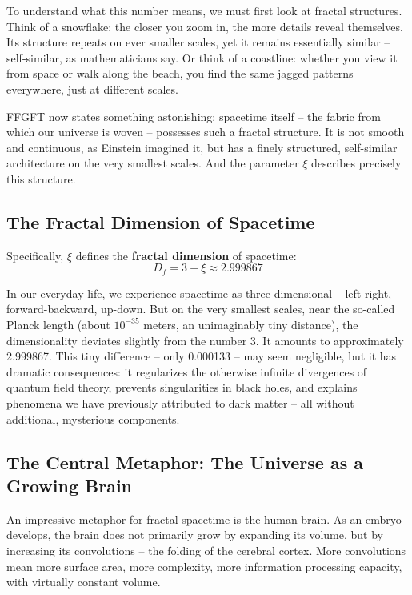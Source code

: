 To understand what this number means, we must first look at fractal structures. Think of a snowflake: the closer you zoom in, the more details reveal themselves. Its structure repeats on ever smaller scales, yet it remains essentially similar -- self-similar, as mathematicians say. Or think of a coastline: whether you view it from space or walk along the beach, you find the same jagged patterns everywhere, just at different scales.

FFGFT now states something astonishing: spacetime itself -- the fabric from which our universe is woven -- possesses such a fractal structure. It is not smooth and continuous, as Einstein imagined it, but has a finely structured, self-similar architecture on the very smallest scales. And the parameter $\xi$ describes precisely this structure.

\subsection{The Fractal Dimension of Spacetime}

Specifically, $\xi$ defines the \textbf{fractal dimension} of spacetime:
\begin{equation}
D_f = 3 - \xi \approx 2.999867
\end{equation}

In our everyday life, we experience spacetime as three-dimensional -- left-right, forward-backward, up-down. But on the very smallest scales, near the so-called Planck length (about $10^{-35}$ meters, an unimaginably tiny distance), the dimensionality deviates slightly from the number 3. It amounts to approximately 2.999867. This tiny difference -- only 0.000133 -- may seem negligible, but it has dramatic consequences: it regularizes the otherwise infinite divergences of quantum field theory, prevents singularities in black holes, and explains phenomena we have previously attributed to dark matter -- all without additional, mysterious components.

\subsection{The Central Metaphor: The Universe as a Growing Brain}

An impressive metaphor for fractal spacetime is the human brain. As an embryo develops, the brain does not primarily grow by expanding its volume, but by increasing its convolutions -- the folding of the cerebral cortex. More convolutions mean more surface area, more complexity, more information processing capacity, with virtually constant volume.


